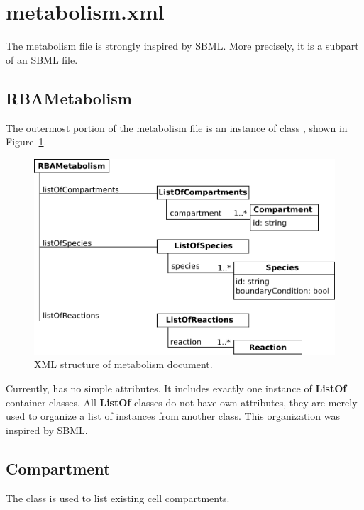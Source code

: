 
\section{metabolism.xml}

The metabolism file is strongly inspired by SBML.\@
More precisely, it is a subpart of an SBML file.


\subsection{RBAMetabolism}
\label{sec:rba_metabolism}

The outermost portion of the metabolism file is an instance of class
\rbametabolism, shown in Figure~\ref{fig:metabolism_doc}.

\begin{figure}
  \centering
  \includegraphics[scale=0.9]{figures/metabolism_doc}
  \caption{XML structure of metabolism document.}
\label{fig:metabolism_doc}
\end{figure}

Currently, \rbametabolism{} has no simple attributes.
It includes exactly one instance of \textbf{ListOf} container classes.
All \textbf{ListOf} classes do not have own attributes,
they are merely used to organize a list of instances from another class.
This organization was inspired by SBML.\@


\subsection{Compartment}
\label{sec:compartment}

The \compartment{} class is used to list existing cell compartments.

